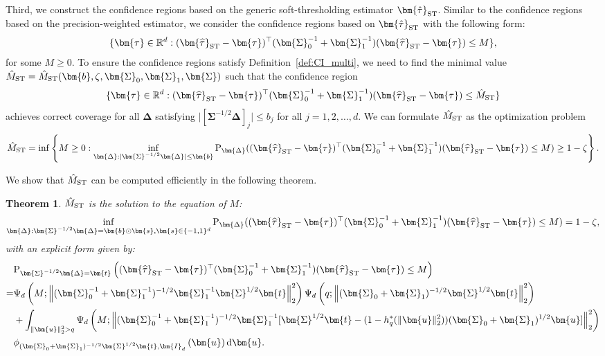 \documentclass[11pt]{article}
\def\P{{\mathrm P}}
\def\d{{\mathrm d}}
\newcommand{\htau}{\widehat\tau}
\numberwithin{equation}{section}
\newtheorem{theorem}{Theorem}[section]
\theoremstyle{definition}
\begin{document}
Third, we construct the confidence regions based on the generic soft-thresholding estimator $\bm{\hat\tau}_{\rm ST}$. Similar to the confidence regions based on the precision-weighted estimator, we consider the confidence regions based on $\bm{\hat\tau}_{\rm ST}$ with the following form:
\[
\{\bm{\tau}\in\mathbb{R}^d:(\bm{\htau}_{\rm ST}-\bm{\tau})^\top (\bm{\Sigma}_0^{-1} + \bm{\Sigma}_1^{-1})(\bm{\htau}_{\rm ST}-\bm{\tau})\le M\},
\]
for some $M \ge 0$. To ensure the confidence regions satisfy Definition~\ref{def:CI_multi}, we need to find the minimal value $\hat{M}_{\rm ST} = \hat{M}_{\rm ST}(\bm{b}, \zeta, \bm{\Sigma}_0, \bm{\Sigma}_1, \bm{\Sigma})$ such that the confidence region
\[
\{\bm{\tau}\in\mathbb{R}^d:(\bm{\htau}_{\rm ST}-\bm{\tau})^\top (\bm{\Sigma}_0^{-1} + \bm{\Sigma}_1^{-1})(\bm{\htau}_{\rm ST}-\bm{\tau})\le \hat{M}_{\rm ST}\}
\]
achieves correct coverage for all $\bm{\Delta}$ satisfying $\lvert [\bm{\Sigma}^{-1/2} \bm{\Delta}]_j \rvert \le b_j$ for all $j=1,2,\ldots,d$. We can formulate $\hat{M}_{\rm ST}$ as the optimization problem
\begin{align*}
  \hat{M}_{\rm ST} = \inf \left\{ M \ge 0: \inf_{\bm{\Delta}: \lvert \bm{\Sigma}^{-1/2} \bm{\Delta}\rvert \le \bm{b}} \P_{\bm{\Delta}}((\bm{\htau}_{\rm ST} - \bm{\tau})^\top (\bm{\Sigma}_0^{-1} + \bm{\Sigma}_1^{-1}) (\bm{\htau}_{\rm ST} - \bm{\tau}) \le M) \ge 1-\zeta \right\}.
\end{align*}

We show that $\hat{M}_{\rm ST}$ can be computed efficiently in the following theorem.

\begin{theorem}\label{prop:CI_multi_ST}
  $\hat{M}_{\rm ST}$ is the solution to the equation of $M$:
  \begin{align*}
    \inf_{\bm{\Delta}: \bm{\Sigma}^{-1/2} \bm{\Delta} = \bm{b} \odot \bm{s}, \bm{s} \in \{-1,1\}^d} \P_{\bm{\Delta}}((\bm{\htau}_{\rm ST} - \bm{\tau})^\top (\bm{\Sigma}_0^{-1} + \bm{\Sigma}_1^{-1}) (\bm{\htau}_{\rm ST} - \bm{\tau}) \le M) = 1-\zeta,
  \end{align*} 
  with an explicit form given by:
  \begin{align}\label{eq:P_multi_ST}
    &\P_{\bm{\Sigma}^{-1/2}\bm{\Delta} = \bm{t}}\left((\bm{\htau}_{\rm ST}-\bm{\tau})^\top (\bm{\Sigma}_0^{-1} + \bm{\Sigma}_1^{-1})(\bm{\htau}_{\rm ST}-\bm{\tau})\le M\right) \nonumber\\
    =& \Psi_d\left(M;\left\lVert (\bm{\Sigma}_0^{-1} + \bm{\Sigma}_1^{-1})^{-1/2} \bm{\Sigma}_1^{-1} \bm{\Sigma}^{1/2} \bm{t}\right\rVert_2^2\right) \Psi_d\left(q; \left\lVert (\bm{\Sigma}_0 + \bm{\Sigma}_1)^{-1/2} \bm{\Sigma}^{1/2} \bm{t}\right\rVert_2^2\right) \nonumber\\
    &+ \int_{\lVert \bm{u} \rVert_2^2 > q} \Psi_d\left(M;\left\lVert (\bm{\Sigma}_0^{-1} + \bm{\Sigma}_1^{-1})^{-1/2} \bm{\Sigma}_1^{-1} [\bm{\Sigma}^{1/2} \bm{t} - (1-h_q^*(\lVert \bm{u} \rVert_2^2))(\bm{\Sigma}_0+ \bm{\Sigma}_1)^{1/2} \bm{u}]\right\rVert_2^2\right) \nonumber\\
    &\phi_{(\bm{\Sigma}_0 + \bm{\Sigma}_1)^{-1/2} \bm{\Sigma}^{1/2} \bm{t}, \bm{I}_d}\left(\bm{u}\right) \d \bm{u}.
  \end{align}
\end{theorem}
\end{document}
